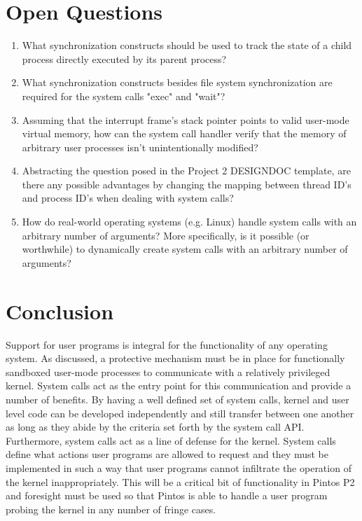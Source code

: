 \documentclass[11pt, letterpaper]{article}
\begin{document}
\section*{Open Questions}

\begin{enumerate}
\item What synchronization constructs should be used to track the state of a child process directly executed by its parent process? 
\item What synchronization constructs besides file system synchronization are required for the system calls "exec" and "wait"?
\item Assuming that the interrupt frame's stack pointer points to valid user-mode virtual memory, how can the system call handler verify that the memory of arbitrary user processes isn't unintentionally modified?
\item Abstracting the question posed in the Project 2 DESIGNDOC template, are there any possible advantages by changing the mapping between thread ID's and process ID's when dealing with system calls?
\item How do real-world operating systems (e.g. Linux) handle system calls with an arbitrary number of arguments? More specifically, is it possible (or worthwhile) to dynamically create system calls with an arbitrary number of arguments?
\end{enumerate} 



\section*{Conclusion}

Support for user programs is integral for the functionality of any operating system. As discussed, a protective mechanism must be in place for functionally sandboxed user-mode processes to communicate with a relatively privileged kernel. System calls act as the 
entry point for this communication and provide a number of benefits. By having a well defined set of system calls, kernel and user 
level code can be developed independently and still transfer between one another as long as they abide by the criteria set forth by 
the system call API. Furthermore, system calls act as a line of defense for the kernel. System calls define what actions user 
programs are allowed to request and they must be implemented in such a way that user programs cannot infiltrate the operation of the
kernel inappropriately. This will be a critical bit of functionality in Pintos P2 and foresight must be used so that Pintos is able
to handle a user program probing the kernel in any number of fringe cases.
\end{document}
